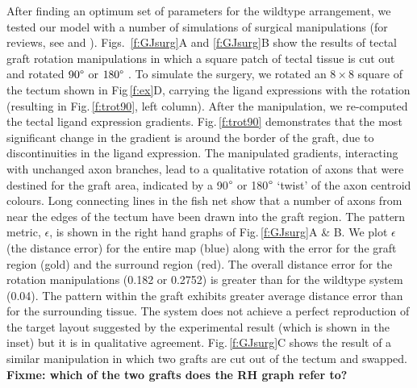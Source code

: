 \documentclass[11pt, a4paper]{article}
\begin{document}
After finding an optimum set of parameters for the wildtype arrangement, we tested our model with a number of simulations of surgical manipulations (for reviews, see \citet{udin_formation_1988} and \citet{goodhill_retinotectal_1999}).
Figs.~\ref{f:GJsurg}A and \ref{f:GJsurg}B show the results of tectal graft rotation manipulations in which a square patch of tectal tissue is cut out and rotated $90\degree$ or $180\degree$ \citep{chung_observations_1978}.
%
To simulate the surgery, we rotated an $8\times8$ square of the tectum shown in Fig\,\ref{f:ex}D, carrying the ligand expressions with the rotation (resulting in Fig.\,\ref{f:trot90}, left column).
After the manipulation, we re-computed the tectal ligand expression gradients. Fig.\,\ref{f:trot90} demonstrates that the most significant change in the gradient is around the border of the graft, due to discontinuities in the ligand expression.
The manipulated gradients, interacting with unchanged axon branches, lead to a qualitative rotation of axons that were destined for the graft area, indicated by a 90$\degree$ or 180$\degree$ `twist' of the axon centroid colours.
Long connecting lines in the fish net show that a number of axons from near the edges of the tectum have been drawn into the graft region.
The pattern metric, $\epsilon$, is shown in the right hand graphs of Fig.\,\ref{f:GJsurg}A \& B.
We plot $\epsilon$ (the distance error) for the entire map (blue) along with the error for the graft region (gold) and the surround region (red).
The overall distance error for the rotation manipulations (0.182 or 0.2752)  is greater than for the wildtype system (0.04).
The pattern within the graft exhibits greater average distance error than for the surrounding tissue.
The system does not achieve a perfect reproduction of the target layout suggested by the experimental result (which is shown in the inset) but it is in qualitative agreement.
%
Fig.\,\ref{f:GJsurg}C shows the result of a similar manipulation in which two grafts are cut out of the tectum and swapped. \textbf{Fixme: which of the two grafts does the RH graph refer to?}
\end{document}
